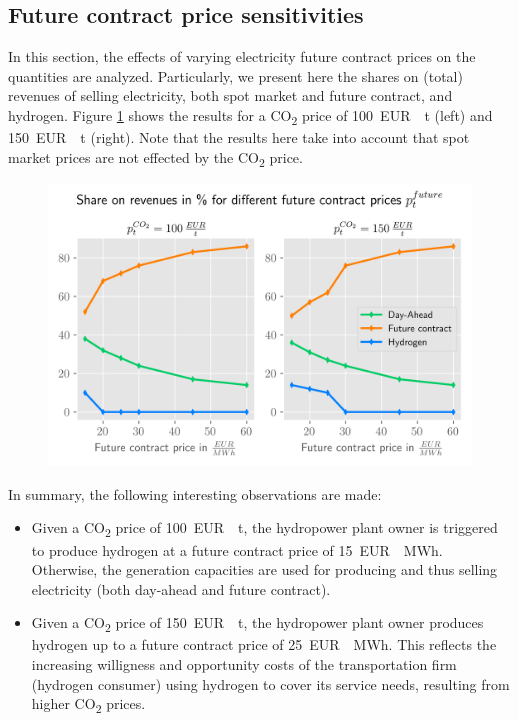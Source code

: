 \documentclass[review]{elsarticle}
\begin{document}
\subsection{Future contract price sensitivities}\label{res:3x_Future}
In this section, the effects of varying electricity future contract prices on the quantities are analyzed. Particularly, we present here the shares on (total) revenues of selling electricity, both spot market and future contract, and hydrogen. Figure \ref{fig:future_sens} shows the results for a CO\textsubscript{2} price of \SI{100}{EUR \per t} (left) and \SI{150}{EUR \per t} (right). Note that the results here take into account that spot market prices are not effected by the CO\textsubscript{2} price.

\begin{figure}[h]
	\centering
	\includegraphics[width=1\linewidth]{figures/future_sensitivities.png}
	\caption{}
	\label{fig:future_sens}
\end{figure}

In summary, the following interesting observations are made:
\begin{itemize}
	\item Given a CO\textsubscript{2} price of \SI{100}{EUR \per t}, the hydropower plant owner is triggered to produce hydrogen at a future contract price of \SI{15}{EUR \per MWh}. Otherwise, the generation capacities are used for producing and thus selling electricity (both day-ahead and future contract).
	\item Given a CO\textsubscript{2} price of \SI{150}{EUR \per t}, the hydropower plant owner produces hydrogen up to a future contract price of \SI{25}{EUR \per MWh}. This reflects the increasing willigness and opportunity costs of the transportation firm (hydrogen consumer) using hydrogen to cover its service needs, resulting from higher CO\textsubscript{2} prices.
\end{itemize}
\end{document}
